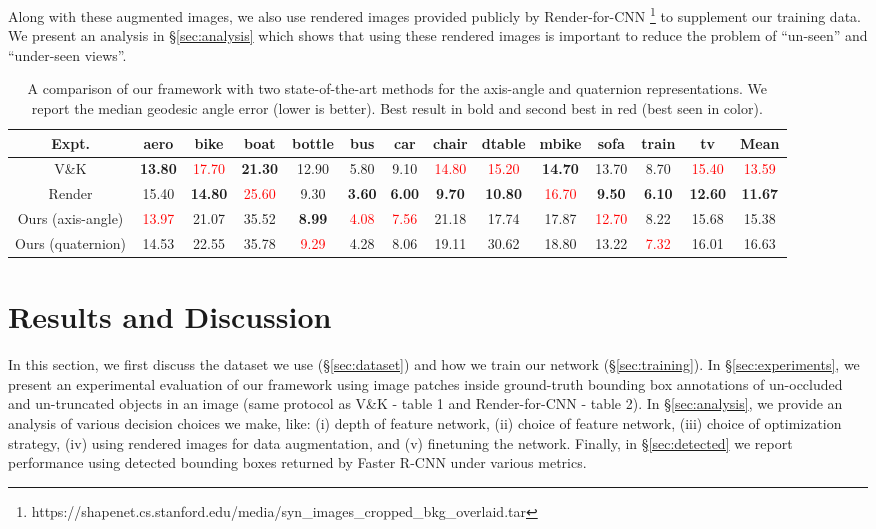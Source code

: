 \documentclass[10pt,twocolumn,letterpaper]{article}
\begin{document}
	Along with these augmented images, we also use rendered images provided publicly by Render-for-CNN \cite{Su:ICCV15} \footnote{https://shapenet.cs.stanford.edu/media/syn\_images\_cropped\_bkg\_overlaid.tar}  to supplement our training data. We present an analysis in \S\ref{sec:analysis} which shows that using these rendered images is important to reduce the problem of ``un-seen'' and ``under-seen views''.
	
	\begin{table*}[ht]
		\centering
		\setlength{\tabcolsep}{1.5mm}
		\begin{tabular}{|c|cccccccccccc|c|}
			\hline
			Expt. & aero & bike & boat & bottle & bus & car & chair & dtable & mbike & sofa	& train & tv & Mean \\
			\hline
			V\&K \cite{Tulsiani:CVPR15} & \textbf{13.80} & \textcolor{red}{17.70} & \textbf{21.30} & 12.90 & 5.80 & 9.10 & \textcolor{red}{14.80} & \textcolor{red}{15.20} & \textbf{14.70} & 13.70 & 8.70 & \textcolor{red}{15.40} & \textcolor{red}{13.59} \\ 
			Render \cite{Su:ICCV15} & 15.40 & \textbf{14.80} & \textcolor{red}{25.60} & 9.30 & \textbf{3.60} & \textbf{6.00} & \textbf{9.70} & \textbf{10.80} & \textcolor{red}{16.70} & \textbf{9.50} & \textbf{6.10} & \textbf{12.60} & \textbf{11.67} \\ 
			\hline
			Ours (axis-angle) & \textcolor{red}{13.97} & 21.07 & 35.52 & \textbf{8.99} & \textcolor{red}{4.08} & \textcolor{red}{7.56} & 21.18 & 17.74 & 17.87 & \textcolor{red}{12.70} & 8.22 & 15.68 & 15.38 \\ 
			Ours (quaternion) & 14.53 & 22.55 & 35.78 & \textcolor{red}{9.29} & 4.28 & 8.06 & 19.11 & 30.62 & 18.80 & 13.22 & \textcolor{red}{7.32} & 16.01 & 16.63 \\ 
			\hline
		\end{tabular}
		\caption{A comparison of our framework with two state-of-the-art methods for the axis-angle and quaternion representations. We report the median geodesic angle error (lower is better). Best result in bold and second best in red (best seen in color).}
		\label{table:main_result}
	\end{table*}

	\section{Results and Discussion}
	\label{sec:results}
	In this section, we first discuss the dataset we use (\S\ref{sec:dataset}) and how we train our network (\S\ref{sec:training}). In \S\ref{sec:experiments}, we present an experimental evaluation of our framework using image patches inside ground-truth bounding box annotations of un-occluded and un-truncated objects in an image (same protocol as V\&K \cite{Tulsiani:CVPR15} - table 1 and Render-for-CNN \cite{Su:ICCV15} - table 2). In \S\ref{sec:analysis}, we provide an analysis of various decision choices we make, like: (i) depth of feature network, (ii) choice of feature network, (iii) choice of optimization strategy, (iv) using rendered images for data augmentation, and (v) finetuning the network. Finally, in \S\ref{sec:detected} we report performance using detected bounding boxes returned by Faster R-CNN \cite{Ren:FasterRCNN} under various metrics.
	
\end{document}
